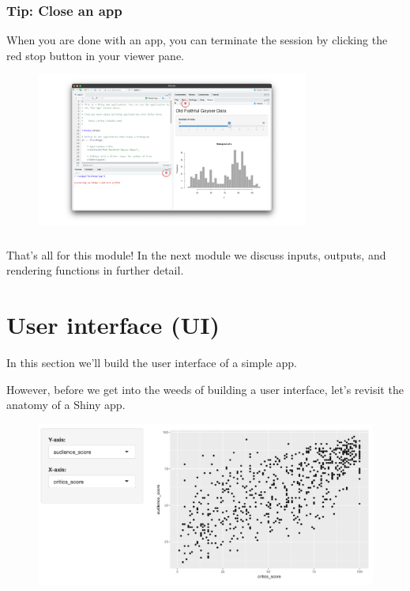 \documentclass[
  letterpaper,
  DIV=11,
  numbers=noendperiod]{scrreprt}
\begin{document}
\hypertarget{tip-close-an-app}{%
\subsection{Tip: Close an app}\label{tip-close-an-app}}

When you are done with an app, you can terminate the session by clicking
the red stop button in your viewer pane.

\begin{figure}

{\centering \includegraphics[width=0.8\textwidth,height=\textheight]{./images/recap-6.png}

}

\end{figure}

\hypertarget{section-8}{%
\subsection{}\label{section-8}}

That's all for this module! In the next module we discuss inputs,
outputs, and rendering functions in further detail.

\hypertarget{user-interface-ui-1}{%
\chapter{User interface (UI)}\label{user-interface-ui-1}}

In this section we'll build the user interface of a simple app.

However, before we get into the weeds of building a user interface,
let's revisit the anatomy of a Shiny app.

\begin{figure}

{\centering \includegraphics[width=1\textwidth,height=\textheight]{./images/app-selectinput-scatterplot.png}

}

\end{figure}
\end{document}
